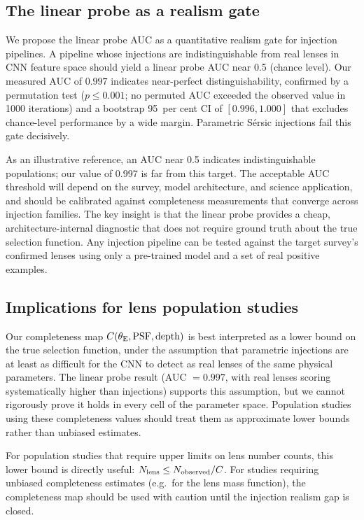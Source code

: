 \documentclass[fleqn,usenatbib]{mnras}
\begin{document}
\subsection{The linear probe as a realism gate}

We propose the linear probe AUC as a quantitative realism gate for injection pipelines.  A pipeline whose injections are indistinguishable from real lenses in CNN feature space should yield a linear probe AUC near 0.5 (chance level).  Our measured AUC of $0.997$ indicates near-perfect distinguishability, confirmed by a permutation test ($p \leq 0.001$; no permuted AUC exceeded the observed value in 1000 iterations) and a bootstrap 95~per cent CI of $[0.996, 1.000]$ that excludes chance-level performance by a wide margin.  Parametric S\'{e}rsic injections fail this gate decisively.

As an illustrative reference, an AUC near 0.5 indicates indistinguishable populations; our value of 0.997 is far from this target.  The acceptable AUC threshold will depend on the survey, model architecture, and science application, and should be calibrated against completeness measurements that converge across injection families.  The key insight is that the linear probe provides a cheap, architecture-internal diagnostic that does not require ground truth about the true selection function.  Any injection pipeline can be tested against the target survey's confirmed lenses using only a pre-trained model and a set of real positive examples.

\subsection{Implications for lens population studies}

Our completeness map $C(\theta_{\rm E}, \mathrm{PSF}, \mathrm{depth})$ is best interpreted as a lower bound on the true selection function, under the assumption that parametric injections are at least as difficult for the CNN to detect as real lenses of the same physical parameters.  The linear probe result (AUC $= 0.997$, with real lenses scoring systematically higher than injections) supports this assumption, but we cannot rigorously prove it holds in every cell of the parameter space.  Population studies using these completeness values should treat them as approximate lower bounds rather than unbiased estimates.

For population studies that require upper limits on lens number counts, this lower bound is directly useful: $N_{\rm lens} \leq N_{\rm observed} / C$.  For studies requiring unbiased completeness estimates (e.g.\ for the lens mass function), the completeness map should be used with caution until the injection realism gap is closed.
\end{document}

